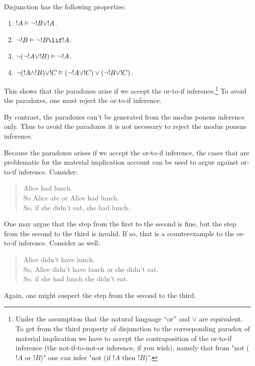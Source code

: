 \documentclass[../../../include/open-logic-section]{subfiles}
\begin{document}
Disjunction has the following properties:

\begin{enumerate}
	\item $!A \Entails \lnot !B \lor !A$.
	\item $\lnot !B \Entails \lnot !B \lif !A$.
	\item $\lnot (\lnot !A \lor !B) \Entails \lnot !A$.
	\item $\lnot (!A \land !B) \lor !C \Entails (\lnot !A \lor !C) \lor (\lnot !B \lor !C)$.
\end{enumerate}

This shows that the paradoxes arise if we accept the or-to-if inference.\footnote{Under the assumption that the natural language ``or'' and $\lor$ are equivalent. To get from the third property of disjunction to the corresponding paradox of material implication we have to accept the contraposition of the or-to-if inference (the not-if-to-not-or inference, if you wish), namely that from "not ($!A$ or $!B$)" one can infer "not (if $!A$ then $!B$)''.} To avoid the paradoxes, one must reject the or-to-if inference. 

By contrast, the paradoxes can't be generated from the modus ponens inference only. Thus to avoid the paradoxes it is not necessary to reject the modus ponens inference.

Because the paradoxes arises if we accept the or-to-if inference, the cases that are problematic for the material implication account can be used to argue against or-to-if inference. Consider: 

\begin{quote}
	Alice had lunch. \\
	So Alice ate or Alice had lunch.\\
	So, if she didn't eat, she had lunch.
\end{quote}

One may argue that the step from the first to the second is fine, but the step from the second to the third is invalid. If so, that is a counterexample to the or-to-if inference. Consider as well:

\begin{quote}
	Alice didn't have lunch. \\
	So, Alice didn't have lunch or she didn't eat.\\
	So, if she had lunch she didn't eat.
\end{quote}

Again, one might suspect the step from the second to the third.
\end{document}
